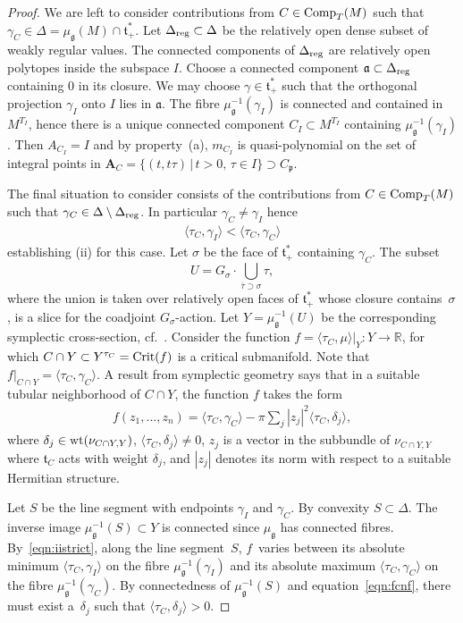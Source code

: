 \documentclass[pdftex]{sigma}
\numberwithin{equation}{section}
\newcommand{\pair}[2]{\langle #1, #2 \rangle}
\newcommand{\ol}[1]{\overline{#1}}
\newcommand{\tn}[1]{\textnormal{#1}}
\def\g{\ensuremath{\mathfrak{g}}}
\def\t{\ensuremath{\mathfrak{t}}}
\def\a{\ensuremath{\mathfrak{a}}}
\def\p{\ensuremath{\mathfrak{p}}}
\def\bR{\ensuremath{\mathbb{R}}}
\begin{document}
\begin{proof}
We are left to consider contributions from $C \in \tn{Comp}_T(M)$ such that $\gamma_C \in \Delta=\mu_\g(M)\cap \t_+^\ast$. Let $\Delta_{\tn{reg}} \subset \Delta$ be the relatively open dense subset of weakly regular values. The connected components of $\Delta_{\tn{reg}}$ are relatively open polytopes inside the subspace $I$. Choose a connected component $\a \subset \Delta_{\tn{reg}}$ containing $0$ in its closure. We may choose $\gamma \in \t^\ast_+$ such that the orthogonal projection $\gamma_I$ onto $I$ lies in $\a$. The fibre $\mu_\g^{-1}(\gamma_I)$ is connected and contained in $M^{T_I}$, hence there is a unique connected component $C_I \subset M^{T_I}$ containing $\mu_\g^{-1}(\gamma_I)$. Then $A_{C_I}=I$ and by property~(a), $m_{C_I}$ is quasi-polynomial on the set of integral points in $\bm{A}_C=\{(t,t\tau)\,|\,t>0,\,\tau \in I\} \supset C_\p$.

The final situation to consider consists of the contributions from $C \in \tn{Comp}_T(M)$ such that $\gamma_C \in \Delta \setminus \Delta_{\tn{reg}}$. In particular $\gamma_C \ne \gamma_I$ hence
\begin{gather}\label{eqn:iistrict}
\pair{\tau_C}{\gamma_I}<\pair{\tau_C}{\gamma_C}
\end{gather}
establishing (ii) for this case. Let $\sigma$ be the face of $\t^\ast_+$ containing $\gamma_C$. The subset
\[ U=G_\sigma\cdot \bigcup_{\ol{\tau}\supset \sigma} \tau, \]
where the union is taken over relatively open faces of $\t^\ast_+$ whose closure contains~$\sigma$, is a slice for the coadjoint $G_\sigma$-action. Let $Y=\mu_\g^{-1}(U)$ be the corresponding symplectic cross-section, cf.\ \cite[Remark~3.7, Theorem~3.8]{ConvexitySympCuts}. Consider the function $f=\pair{\tau_C}{\mu}|_Y \colon Y \rightarrow \bR$, for which $C \cap Y \subset Y^{\tau_C}=\tn{Crit}(f)$ is a critical submanifold. Note that $f|_{C\cap Y}=\pair{\tau_C}{\gamma_C}$. A result from symplectic geometry says that in a suitable tubular neighborhood of $C \cap Y$, the function $f$ takes the form
\begin{gather}\label{eqn:fcnf}
f(z_1,\dots,z_n)=\pair{\tau_C}{\gamma_C}-\pi \sum_j |z_j|^2\pair{\tau_C}{\delta_j},
\end{gather}
where $\delta_j \in \tn{wt}(\nu_{C\cap Y,Y})$, $\pair{\tau_C}{\delta_j}\ne 0$, $z_j$ is a vector in the subbundle of $\nu_{C\cap Y,Y}$ where $\t_C$ acts with weight $\delta_j$, and $|z_j|$ denotes its norm with respect to a suitable Hermitian structure.

Let $S$ be the line segment with endpoints $\gamma_I$ and $\gamma_C$. By convexity $S \subset \Delta$. The inverse image $\mu_\g^{-1}(S) \subset Y$ is connected since $\mu_\g$ has connected fibres. By~\eqref{eqn:iistrict}, along the line segment~$S$, $f$~varies between its absolute minimum $\pair{\tau_C}{\gamma_I}$ on the fibre $\mu_\g^{-1}(\gamma_I)$ and its absolute maximum $\pair{\tau_C}{\gamma_C}$ on the fibre $\mu_\g^{-1}(\gamma_C)$. By connectedness of $\mu_\g^{-1}(S)$ and equation~\eqref{eqn:fcnf}, there must exist a~$\delta_j$ such that $\pair{\tau_C}{\delta_j}>0$.


\end{proof}
\end{document}
